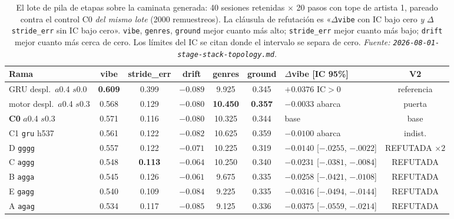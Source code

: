 \documentclass[11pt]{article}
\newcommand{\best}[1]{\textbf{#1}}
\begin{document}
\begin{table}[ht]
  \centering
  \caption{El lote de pila de etapas sobre la caminata generada: \num{40} sesiones
  retenidas $\times$ \num{20} pasos con tope de artista 1, pareado contra el
  control C0 \emph{del mismo lote} (\num{2000} remuestreos). La cláusula de
  refutación es «$\Delta$\texttt{vibe} con IC bajo cero \emph{y}
  $\Delta$\texttt{stride\_err} sin IC bajo cero». \texttt{vibe},
  \texttt{genres}, \texttt{ground} mejor cuanto más alto; \texttt{stride\_err}
  mejor cuanto más bajo; \texttt{drift} mejor cuanto más cerca de cero. Los límites
  del IC se citan donde el intervalo se separa de cero.
  \emph{Fuente: \texttt{2026-08-01-stage-stack-topology.md}.}}
  \label{tab:stagestack-s2}
  {\footnotesize\setlength{\tabcolsep}{2.2pt}\begin{tabular}{lccccclc}
    \toprule
    Rama & vibe & stride\_err & drift & genres & ground & $\Delta$vibe [IC 95\%] & V2 \\
    \midrule
    GRU despl.\ $a$0.4 $s$0.0 & \best{0.609} & 0.399 & $-0.089$ & 9.925 & 0.345 & $+0.0376$ IC$>$0 & referencia \\
    motor despl.\ $a$0.4 $s$0.3 & 0.568 & 0.129 & $-0.080$ & \best{10.450} & \best{0.357} & $-0.0033$ abarca & puerta \\
    \textbf{C0} $a$0.4 $s$0.3 & 0.571 & 0.116 & $-0.080$ & 10.325 & 0.344 & base & base \\
    C1 \texttt{gru} h537 & 0.561 & 0.122 & $-0.082$ & 10.625 & 0.359 & $-0.0100$ abarca & indist. \\
    D \texttt{gggg} & 0.557 & 0.122 & $-0.071$ & 10.225 & 0.319 & $-0.0140$ [$-.0255$, $-.0022$] & REFUTADA $\times2$ \\
    C \texttt{aggg} & 0.548 & \best{0.113} & $-0.064$ & 10.250 & 0.340 & $-0.0231$ [$-.0381$, $-.0084$] & REFUTADA \\
    B \texttt{agga} & 0.545 & 0.126 & \best{$-0.061$} & 9.675 & 0.335 & $-0.0258$ [$-.0421$, $-.0108$] & REFUTADA \\
    E \texttt{gagg} & 0.540 & 0.109 & $-0.084$ & 9.225 & 0.335 & $-0.0316$ [$-.0494$, $-.0144$] & REFUTADA \\
    A \texttt{agag} & 0.534 & 0.117 & $-0.085$ & 9.125 & 0.336 & $-0.0375$ [$-.0559$, $-.0214$] & REFUTADA \\
    \bottomrule
  \end{tabular}}
\end{table}
\end{document}
